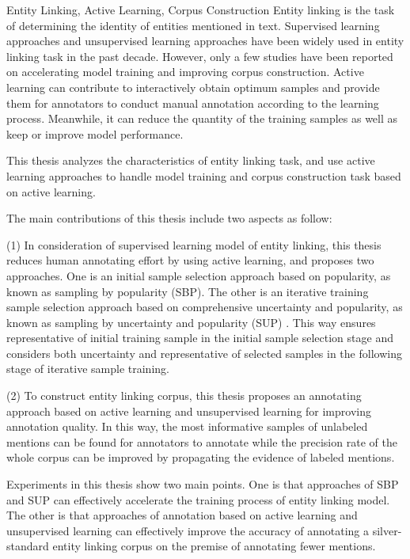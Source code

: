 \begin{englishabstract}{Entity Linking, Active Learning, Corpus Construction}
	Entity linking is the task of determining the identity of entities mentioned in text. Supervised learning approaches and unsupervised learning approaches have been widely used in entity linking task in the past decade. However, only a few studies have been reported on accelerating model training and improving corpus construction. Active learning can contribute to interactively obtain optimum samples and provide them for annotators to conduct manual annotation according to the learning process. Meanwhile, it can reduce the quantity of the training samples as well as keep or improve model performance.
	
	This thesis analyzes the characteristics of entity linking task, and use active learning approaches to handle model training and corpus construction task based on active learning.
	
	The main contributions of this thesis include two aspects as follow:
	
	(1) In consideration of supervised learning model of entity linking, this thesis reduces human annotating effort by using active learning, and proposes two approaches. One is an initial sample selection approach based on popularity, as known as sampling by popularity (SBP). The other is an iterative training sample selection approach based on comprehensive uncertainty and popularity, as known as sampling by uncertainty and popularity (SUP) . This way ensures representative of initial training sample in the initial sample selection stage and considers both uncertainty and representative of selected samples in the following stage of iterative sample training.
	
	(2) To construct entity linking corpus, this thesis proposes an annotating approach based on active learning and unsupervised learning for improving annotation quality. In this way, the most informative samples of unlabeled mentions can be found for annotators to annotate while the precision rate of the whole corpus can be improved by propagating the evidence of labeled mentions.
	
	Experiments in this thesis show two main points. One is that approaches of SBP and SUP can effectively accelerate the training process of entity linking model. The other is that approaches of annotation based on active learning and unsupervised learning can effectively improve the accuracy of annotating a silver-standard entity linking corpus on the premise of annotating fewer mentions.
\end{englishabstract}